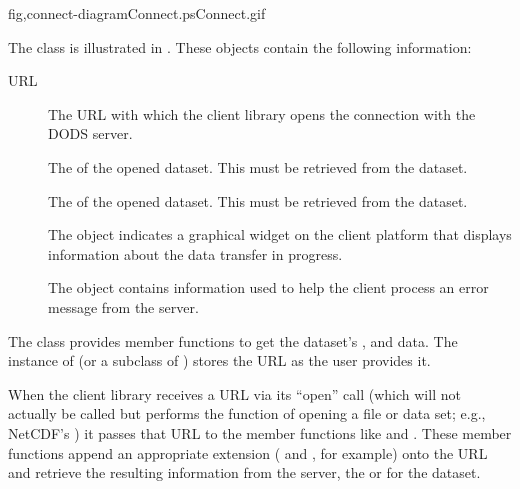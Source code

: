 {fig,connect-diagram}{Connect.ps}{Connect.gif}{}

The  class is illustrated in
.  These objects contain the following
information:

\begin{description}

\item[URL] The URL with which the client library opens the connection
  with the DODS server.
  
\item[] The  of the opened dataset.  This must
  be retrieved from the dataset.
  
\item[] The  of the opened dataset.  This must
  be retrieved from the dataset.
  
\item[] The  object indicates a graphical widget
  on the client platform that displays information about the data
  transfer in progress.
  
\item[] The  object contains information
  used to help the client process an error message from the server.

%

\end{description}

The  class provides member functions to get the
dataset's ,  and data. The instance of
 (or a subclass of ) stores the URL as
the user provides it.

When the client library receives a URL via its ``open'' call (which
will not actually be called  but performs the function of
opening a file or data set; e.g., NetCDF's ) it passes
that URL to the  member functions like
 and . These member functions
append an appropriate extension ( and , for
example) onto the URL and retrieve the resulting information from the
server, the  or  for the dataset.


